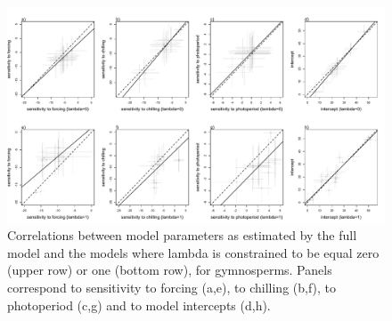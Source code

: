 \documentclass{article}\usepackage[]{graphicx}\usepackage[]{color}
\begin{document}
\begin{figure} [H]
  \begin{center}
  \includegraphics[width=14cm]{../../analyses/phylogeny/figures/Est_correls_vs_lamb01_gymno.pdf}
  \caption{Correlations between model parameters as estimated by the full model and the models where lambda is constrained to be equal zero (upper row) or one (bottom row), for gymnosperms. Panels correspond to sensitivity to forcing (a,e), to chilling (b,f), to photoperiod (c,g) and to model intercepts (d,h).}
  \label{fig:correls_gymno}
  \end{center}
\end{figure}
\end{document}
